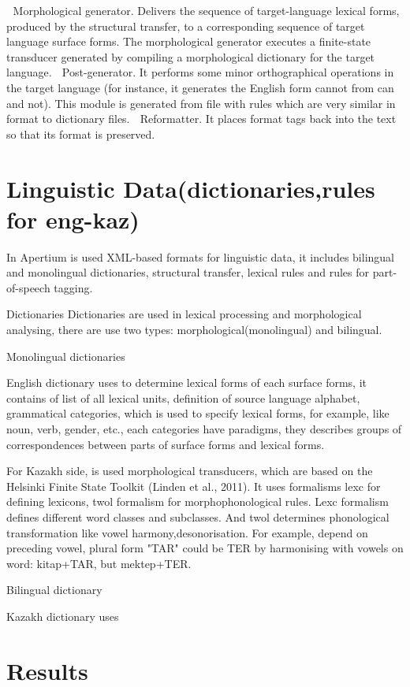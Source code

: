 \documentclass[a4paper,twocolumn,11pt]{article}
\begin{document}
	 Morphological generator. Delivers the sequence of target-language lexical forms, produced by the structural transfer, to a corresponding sequence of target language surface forms. The morphological generator executes a finite-state transducer generated by compiling a morphological dictionary for the target language.     
	Post-generator. It performs some minor orthographical operations in the target language (for instance, it generates the English form cannot from can and not). This module is generated from file with rules which are very   similar in format to dictionary files. 
	Reformatter. It places format tags back into the text so that its format is preserved.



\section{Linguistic Data(dictionaries,rules for eng-kaz)}

In Apertium is used XML-based formats for linguistic data, it includes bilingual and monolingual dictionaries, structural transfer, lexical rules and rules for part-of-speech tagging.

Dictionaries
Dictionaries are used in lexical processing and morphological analysing, there are use two types: morphological(monolingual) and bilingual.

Monolingual dictionaries 

English dictionary uses to determine lexical forms of each surface forms, it contains of list of all lexical units, definition of source language alphabet, grammatical categories, which is used to specify lexical forms, for example, like noun, verb, gender, etc., each categories have paradigms, they describes groups of correspondences between parts of surface forms and lexical forms. 

For Kazakh side, is used morphological transducers, which are based on the Helsinki
Finite State Toolkit (Linden et al., 2011). It uses formalisms lexc for defining lexicons, twol formalism for morphophonological rules. Lexc formalism defines different word classes and subclasses. And twol determines phonological transformation like vowel harmony,desonorisation. For example, depend on preceding vowel, plural form "TAR" could be TER by harmonising with vowels on word: kitap+TAR, but mektep+TER.

Bilingual dictionary

Kazakh dictionary uses
\section{Results}
\end{document}
